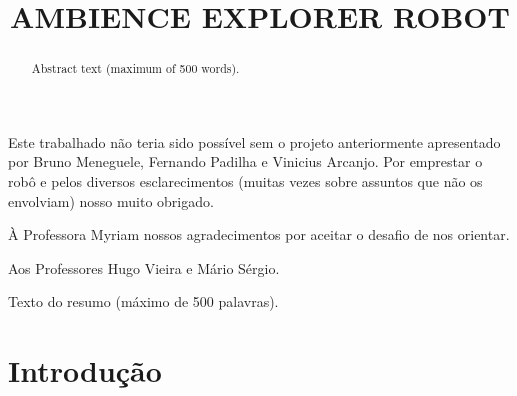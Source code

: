 \documentclass[oneside]{normas-utf-tex} %
\title{\MakeUppercase{Ambience Explorer Robot}} %
\begin{document}
\capa %
\folhaderosto %


\begin{agradecimentos}
Este trabalhado não teria sido possível sem o projeto anteriormente apresentado por Bruno Meneguele, Fernando Padilha e Vinicius Arcanjo.
Por emprestar o robô e pelos diversos esclarecimentos (muitas vezes sobre assuntos que não os envolviam) nosso muito obrigado.

À Professora Myriam nossos agradecimentos por aceitar o desafio de nos orientar. 

Aos Professores Hugo Vieira e Mário Sérgio.
 
\end{agradecimentos}


\begin{resumo}
Texto do resumo (m\'aximo de 500 palavras).
\end{resumo}

\begin{abstract}
Abstract text (maximum of 500 words).
\end{abstract}

\listadefiguras %
\listadetabelas %
\listadesiglas %
\listadesimbolos %

\sumario %


%
%
%
%


\chapter{Introdução}
\end{document}
